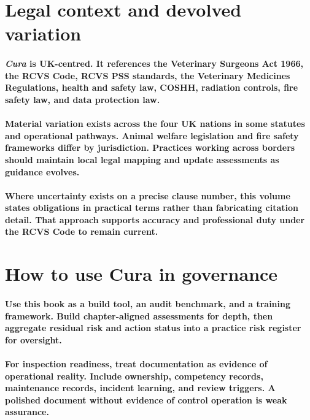\section{Legal context and devolved variation}

\paragraph{\textit{Cura} is UK-centred. It references the Veterinary Surgeons Act 1966, the RCVS Code, RCVS PSS standards, the Veterinary Medicines Regulations, health and safety law, COSHH, radiation controls, fire safety law, and data protection law.}

\paragraph{Material variation exists across the four UK nations in some statutes and operational pathways. Animal welfare legislation and fire safety frameworks differ by jurisdiction. Practices working across borders should maintain local legal mapping and update assessments as guidance evolves.}

\paragraph{Where uncertainty exists on a precise clause number, this volume states obligations in practical terms rather than fabricating citation detail. That approach supports accuracy and professional duty under the RCVS Code to remain current.}

\section{How to use Cura in governance}

\paragraph{Use this book as a build tool, an audit benchmark, and a training framework. Build chapter-aligned assessments for depth, then aggregate residual risk and action status into a practice risk register for oversight.}

\paragraph{For inspection readiness, treat documentation as evidence of operational reality. Include ownership, competency records, maintenance records, incident learning, and review triggers. A polished document without evidence of control operation is weak assurance.}

